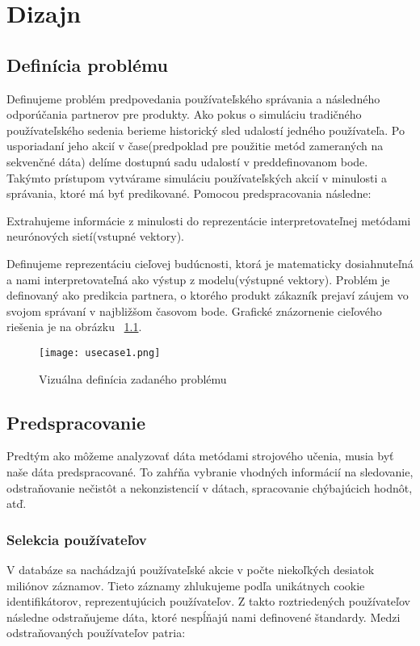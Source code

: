 \newpage
\chapter{Dizajn} 
\label{design}

\section{Definícia problému}
Definujeme problém predpovedania používateľského správania a následného odporúčania partnerov pre produkty. Ako pokus o simuláciu tradičného používateľského sedenia berieme historický sled udalostí jedného používateľa. Po usporiadaní jeho akcií v čase(predpoklad pre použitie metód zameraných na sekvenčné dáta) delíme dostupnú sadu udalostí v preddefinovanom bode. Takýmto prístupom vytvárame simuláciu používateľských akcií v minulosti a správania, ktoré má byť predikované. Pomocou predspracovania následne:
\begin{my_itemize}
	\item Extrahujeme informácie z minulosti do reprezentácie interpretovateľnej metódami neurónových sietí(vstupné vektory).
	\item Definujeme reprezentáciu cieľovej budúcnosti, ktorá je matematicky dosiahnuteľná a nami interpretovateľná ako výstup z modelu(výstupné vektory). Problém je definovaný ako predikcia partnera, o ktorého produkt zákazník prejaví záujem vo svojom správaní v najbližšom časovom bode. Grafické znázornenie cieľového riešenia je na obrázku ~\ref{fig:usecase1}.
\end{my_itemize}

\begin{figure}[H]
\begin{center}
\texttt{[image: usecase1.png]}\end{center}
\caption[usecase1]{Vizuálna definícia zadaného problému}
\label{fig:usecase1}
\end{figure}

\section{Predspracovanie}

Predtým ako môžeme analyzovať dáta metódami strojového učenia, musia byť naše dáta predspracované. To zahŕňa vybranie vhodných informácií na sledovanie, odstraňovanie nečistôt a nekonzistencií v dátach, spracovanie chýbajúcich hodnôt, atď.

\subsection{Selekcia používateľov}
V databáze sa nachádzajú používateľské akcie v počte niekoľkých desiatok miliónov záznamov. Tieto záznamy zhlukujeme podľa unikátnych cookie identifikátorov, reprezentujúcich používateľov. Z takto roztriedených používateľov následne odstraňujeme dáta, ktoré nespĺňajú nami definovené štandardy. Medzi odstraňovaných používateľov patria:


